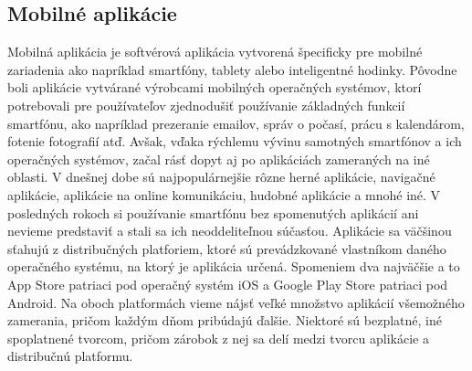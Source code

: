 \subsection{Mobilné aplikácie}
Mobilná aplikácia je softvérová aplikácia vytvorená špecificky pre mobilné zariadenia ako napríklad smartfóny, tablety alebo inteligentné hodinky. Pôvodne boli aplikácie vytvárané výrobcami mobilných operačných systémov, ktorí potrebovali pre používateľov zjednodušiť používanie základných funkcií smartfónu, ako napríklad prezeranie emailov, správ o počasí, prácu s kalendárom, fotenie fotografií atď. Avšak, vďaka rýchlemu vývinu samotných smartfónov a ich operačných systémov, začal rásť dopyt aj po aplikáciách zameraných na iné oblasti. V dnešnej dobe sú najpopulárnejšie rôzne herné aplikácie, navigačné aplikácie, aplikácie na online komunikáciu, hudobné aplikácie a mnohé iné. V posledných rokoch si používanie smartfónu bez spomenutých aplikácií ani nevieme predstaviť a stali sa ich neoddeliteľnou súčasťou. Aplikácie sa väčšinou sťahujú z distribučných platforiem, ktoré sú prevádzkované vlastníkom daného operačného systému, na ktorý je aplikácia určená. Spomeniem dva najväčšie a to App Store patriaci pod operačný systém iOS a Google Play Store patriaci pod Android. Na oboch platformách vieme nájsť veľké množstvo aplikácií všemožného zamerania, pričom každým dňom pribúdajú ďalšie. Niektoré sú bezplatné, iné spoplatnené tvorcom, pričom zárobok z nej sa delí medzi tvorcu aplikácie a distribučnú platformu. \\
